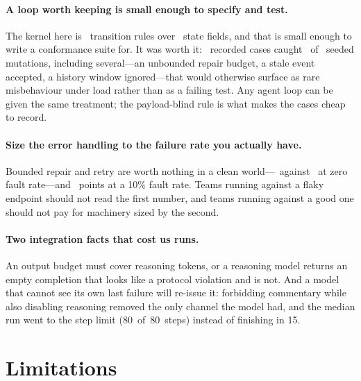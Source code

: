 \documentclass[11pt,a4paper]{article}
\begin{document}
\paragraph{A loop worth keeping is small enough to specify and test.}
The kernel here is \almrules\ transition rules over \almfields\ state fields,
and that is small enough to write a conformance suite for. It was worth it:
\confcases\ recorded cases caught \mutcaught\ of \muttotal\ seeded mutations,
including several---an unbounded repair budget, a stale event accepted, a
history window ignored---that would otherwise surface as rare misbehaviour
under load rather than as a failing test. Any agent loop can be given the same
treatment; the payload-blind rule is what makes the cases cheap to record.

\paragraph{Size the error handling to the failure rate you actually have.}
Bounded repair and retry are worth nothing in a clean world---\fullclean\
against \norecclean\ at zero fault rate---and \recoverygain\ points at a 10\%
fault rate. Teams running against a flaky endpoint should not read the first
number, and teams running against a good one should not pay for machinery
sized by the second.

\paragraph{Two integration facts that cost us runs.}
An output budget must cover reasoning tokens, or a reasoning model returns an
empty completion that looks like a protocol violation and is not. And a model
that cannot see its own last failure will re-issue it: forbidding commentary
while also disabling reasoning removed the only channel the model had, and the
median run went to the step limit \mbox{(80 of 80 steps)} instead of finishing
in 15.

\section{Limitations}
\end{document}
